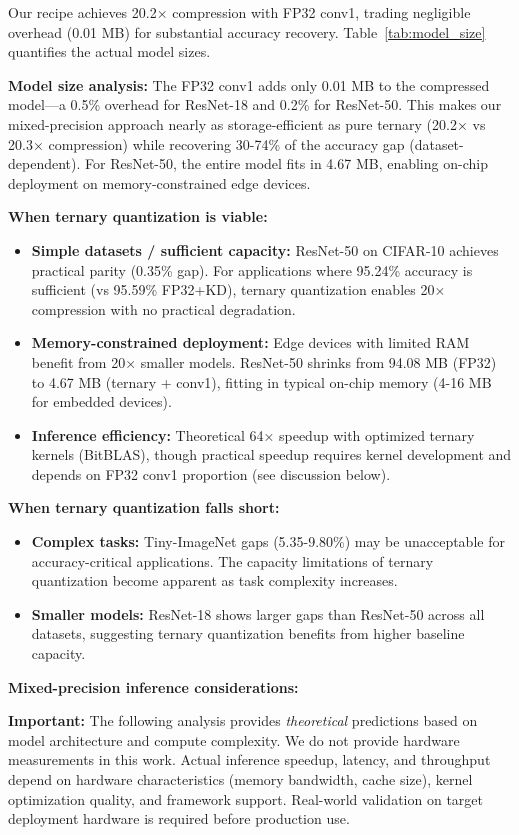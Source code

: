 Our recipe achieves 20.2× compression with FP32 conv1, trading negligible overhead (0.01 MB) for substantial accuracy recovery. Table~\ref{tab:model_size} quantifies the actual model sizes.



\textbf{Model size analysis:}
The FP32 conv1 adds only 0.01 MB to the compressed model—a 0.5\% overhead for ResNet-18 and 0.2\% for ResNet-50. This makes our mixed-precision approach nearly as storage-efficient as pure ternary (20.2× vs 20.3× compression) while recovering 30-74\% of the accuracy gap (dataset-dependent). For ResNet-50, the entire model fits in 4.67 MB, enabling on-chip deployment on memory-constrained edge devices.

\textbf{When ternary quantization is viable:}
\begin{itemize}
    \item \textbf{Simple datasets / sufficient capacity:} ResNet-50 on CIFAR-10 achieves practical parity (0.35\% gap). For applications where 95.24\% accuracy is sufficient (vs 95.59\% FP32+KD), ternary quantization enables 20× compression with no practical degradation.
    \item \textbf{Memory-constrained deployment:} Edge devices with limited RAM benefit from 20× smaller models. ResNet-50 shrinks from 94.08 MB (FP32) to 4.67 MB (ternary + conv1), fitting in typical on-chip memory (4-16 MB for embedded devices).
    \item \textbf{Inference efficiency:} Theoretical 64× speedup with optimized ternary kernels (BitBLAS), though practical speedup requires kernel development and depends on FP32 conv1 proportion (see discussion below).
\end{itemize}

\textbf{When ternary quantization falls short:}
\begin{itemize}
    \item \textbf{Complex tasks:} Tiny-ImageNet gaps (5.35-9.80\%) may be unacceptable for accuracy-critical applications. The capacity limitations of ternary quantization become apparent as task complexity increases.
    \item \textbf{Smaller models:} ResNet-18 shows larger gaps than ResNet-50 across all datasets, suggesting ternary quantization benefits from higher baseline capacity.
\end{itemize}

\textbf{Mixed-precision inference considerations:}

\textbf{Important:} The following analysis provides \textit{theoretical} predictions based on model architecture and compute complexity. We do not provide hardware measurements in this work. Actual inference speedup, latency, and throughput depend on hardware characteristics (memory bandwidth, cache size), kernel optimization quality, and framework support. Real-world validation on target deployment hardware is required before production use.

